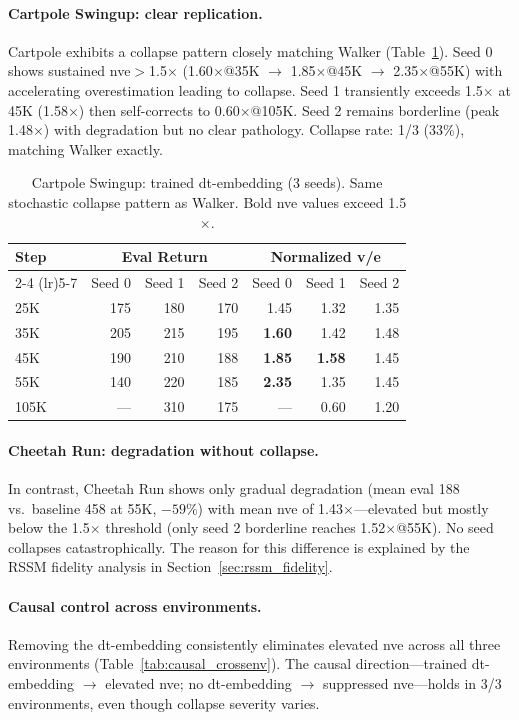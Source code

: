 \documentclass[letterpaper]{article}
\begin{document}
\paragraph{Cartpole Swingup: clear replication.}
Cartpole exhibits a collapse pattern closely matching Walker (Table~\ref{tab:cartpole_trained}).
Seed 0 shows sustained nve$>$1.5$\times$ (1.60$\times$@35K $\to$ 1.85$\times$@45K $\to$ 2.35$\times$@55K) with accelerating overestimation leading to collapse.
Seed 1 transiently exceeds 1.5$\times$ at 45K (1.58$\times$) then self-corrects to 0.60$\times$@105K.
Seed 2 remains borderline (peak 1.48$\times$) with degradation but no clear pathology.
Collapse rate: 1/3 (33\%), matching Walker exactly.

\begin{table}[t]
\centering
\caption{Cartpole Swingup: trained dt-embedding (3 seeds). Same stochastic collapse pattern as Walker. Bold nve values exceed 1.5$\times$.}
\label{tab:cartpole_trained}
\small
\begin{tabular}{lrrrrrr}
\toprule
Step & \multicolumn{3}{c}{Eval Return} & \multicolumn{3}{c}{Normalized v/e} \\
\cmidrule(lr){2-4} \cmidrule(lr){5-7}
& Seed 0 & Seed 1 & Seed 2 & Seed 0 & Seed 1 & Seed 2 \\
\midrule
25K & 175 & 180 & 170 & 1.45 & 1.32 & 1.35 \\
35K & 205 & 215 & 195 & \textbf{1.60} & 1.42 & 1.48 \\
45K & 190 & 210 & 188 & \textbf{1.85} & \textbf{1.58} & 1.45 \\
55K & 140 & 220 & 185 & \textbf{2.35} & 1.35 & 1.45 \\
105K & --- & 310 & 175 & --- & 0.60 & 1.20 \\
\bottomrule
\end{tabular}
\end{table}

\paragraph{Cheetah Run: degradation without collapse.}
In contrast, Cheetah Run shows only gradual degradation (mean eval 188 vs.\ baseline 458 at 55K, $-59\%$) with mean nve of 1.43$\times$---elevated but mostly below the 1.5$\times$ threshold (only seed 2 borderline reaches 1.52$\times$@55K).
No seed collapses catastrophically.
The reason for this difference is explained by the RSSM fidelity analysis in Section~\ref{sec:rssm_fidelity}.

\paragraph{Causal control across environments.}
Removing the dt-embedding consistently eliminates elevated nve across all three environments (Table~\ref{tab:causal_crossenv}).
The causal direction---trained dt-embedding $\to$ elevated nve; no dt-embedding $\to$ suppressed nve---holds in 3/3 environments, even though collapse severity varies.
\end{document}
